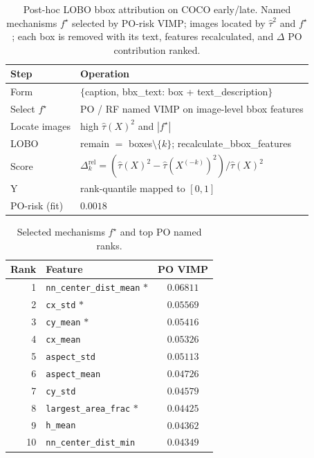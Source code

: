 
\begin{table}[ht]
\centering
\caption{Post-hoc LOBO bbox attribution on COCO early/late. Named mechanisms $f^{\star}$ selected by PO-risk VIMP; images located by $\widehat\tau^2$ and $f^{\star}$; each box is removed with its text, features recalculated, and $\Delta$ PO contribution ranked.}
\label{tab:coco-lobo-pipeline}
\small
\begin{tabular}{@{}l l@{}}
\toprule
Step & Operation \\
\midrule
Form & $\{$caption, bbx\_text: box + text\_description$\}$ \\
Select $f^{\star}$ & PO / RF named VIMP on image-level bbox features \\
Locate images & high $\widehat\tau(X)^2$ and $|f^{\star}|$ \\
LOBO & remain $=$ boxes$\setminus\{k\}$; recalculate\_bbox\_features \\
Score & $\Delta_k^{\mathrm{rel}}=(\widehat\tau(X)^2-\widehat\tau(X^{(-k)})^2)/\widehat\tau(X)^2$ \\
Y & rank-quantile mapped to $[0,1]$ \\
PO-risk (fit) & $0.0018$ \\
\bottomrule
\end{tabular}
\end{table}

\begin{table}[ht]
\centering
\caption{Selected mechanisms $f^{\star}$ and top PO named ranks.}
\label{tab:coco-lobo-fstar}
\small
\begin{tabular}{@{}r l c@{}}
\toprule
Rank & Feature & PO VIMP \\
\midrule
1 & \texttt{nn\_center\_dist\_mean} $*$ & $0.06811$ \\
2 & \texttt{cx\_std} $*$ & $0.05569$ \\
3 & \texttt{cy\_mean} $*$ & $0.05416$ \\
4 & \texttt{cx\_mean} & $0.05326$ \\
5 & \texttt{aspect\_std} & $0.05113$ \\
6 & \texttt{aspect\_mean} & $0.04726$ \\
7 & \texttt{cy\_std} & $0.04579$ \\
8 & \texttt{largest\_area\_frac} $*$ & $0.04425$ \\
9 & \texttt{h\_mean} & $0.04362$ \\
10 & \texttt{nn\_center\_dist\_min} & $0.04349$ \\
\bottomrule
\end{tabular}
\end{table}

